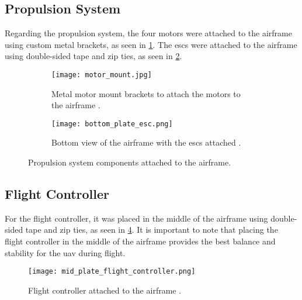 \subsection{Propulsion System}\label{subsec:implementation_propulsion_system}

Regarding the propulsion system, the four motors were attached to the airframe using custom metal brackets, as seen in \cref{fig:motors_attached_to_airframe}. The \glspl{esc} were attached to the airframe using double-sided tape and zip ties, as seen in \cref{fig:esc_attached_to_airframe}.

\begin{figure}
  \hfill
  \begin{subfigure}{0.4\textwidth}
    \texttt{[image: motor\_mount.jpg]}
    \caption{Metal motor mount brackets to attach the motors to the airframe \autocite{developingcosteffectivedrones5g}.}\label{fig:motors_attached_to_airframe}
  \end{subfigure}
  \hfill
  \begin{subfigure}{0.4\textwidth}
    \texttt{[image: bottom\_plate\_esc.png]}
    \caption{Bottom view of the airframe with the \glspl{esc} attached \autocite{developingcosteffectivedrones5g}.}\label{fig:esc_attached_to_airframe}
  \end{subfigure}
  \hfill

  \caption{Propulsion system components attached to the airframe.}\label{fig:propulsion_system_components_attached_to_airframe}
\end{figure}

\subsection{Flight Controller}\label{subsec:implementation_flight_controller}

For the flight controller, it was placed in the middle of the airframe using double-sided tape and zip ties, as seen in \cref{fig:flight_controller_attached_to_airframe}. It is important to note that placing the flight controller in the middle of the airframe provides the best balance and stability for the \gls{uav} during flight.

\begin{figure}
  \texttt{[image: mid\_plate\_flight\_controller.png]}
  \caption{Flight controller attached to the airframe \autocite{developingcosteffectivedrones5g}.}\label{fig:flight_controller_attached_to_airframe}
\end{figure}

